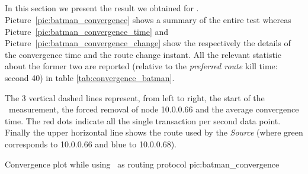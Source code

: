 \subsection{\batman}
In this section we present the result we obtained for
\batman. Picture~\ref{pic:batman_convergence} shows a summary of the
entire test whereas Picture~\ref{pic:batman_convergence_time}
and Picture~\ref{pic:batman_convergence_change} show the respectively the
details of the convergence time and the route change instant. All the relevant
statistic about the former two are reported (relative to the
\emph{preferred route} kill time: second 40) in table \ref{tab:convergence_batman}.

The 3 vertical dashed lines represent, from left to right, the start of
the \netperf\ measurement, the forced removal of node 10.0.0.66 and the
average convergence time. The red dots indicate all the single
transaction per second data point. Finally the upper horizontal line
shows
the route used by the \emph{Source} (where green corresponds to 10.0.0.66 and
blue to 10.0.0.68).

            {\textwidth}
            {Convergence plot while using \batman\ as routing protocol}
            {pic:batman_convergence}


